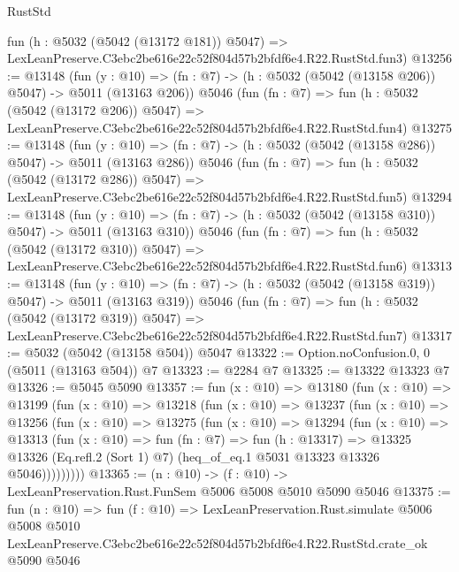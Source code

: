 \begin{lexlean}{RustStd}
\begin{coremodule}
    fun (h : @5032 (@5042 (@13172 @181)) @5047) =>
    LexLeanPreserve.C3ebc2be616e22c52f804d57b2bfdf6e4.R22.RustStd.fun3)
@13256 := @13148
    (fun (y : @10) => (fn : @7) -> (h : @5032 (@5042 (@13158 @206)) @5047) -> @5011 (@13163 @206))
    @5046
    (fun (fn : @7) =>
    fun (h : @5032 (@5042 (@13172 @206)) @5047) =>
    LexLeanPreserve.C3ebc2be616e22c52f804d57b2bfdf6e4.R22.RustStd.fun4)
@13275 := @13148
    (fun (y : @10) => (fn : @7) -> (h : @5032 (@5042 (@13158 @286)) @5047) -> @5011 (@13163 @286))
    @5046
    (fun (fn : @7) =>
    fun (h : @5032 (@5042 (@13172 @286)) @5047) =>
    LexLeanPreserve.C3ebc2be616e22c52f804d57b2bfdf6e4.R22.RustStd.fun5)
@13294 := @13148
    (fun (y : @10) => (fn : @7) -> (h : @5032 (@5042 (@13158 @310)) @5047) -> @5011 (@13163 @310))
    @5046
    (fun (fn : @7) =>
    fun (h : @5032 (@5042 (@13172 @310)) @5047) =>
    LexLeanPreserve.C3ebc2be616e22c52f804d57b2bfdf6e4.R22.RustStd.fun6)
@13313 := @13148
    (fun (y : @10) => (fn : @7) -> (h : @5032 (@5042 (@13158 @319)) @5047) -> @5011 (@13163 @319))
    @5046
    (fun (fn : @7) =>
    fun (h : @5032 (@5042 (@13172 @319)) @5047) =>
    LexLeanPreserve.C3ebc2be616e22c52f804d57b2bfdf6e4.R22.RustStd.fun7)
@13317 := @5032 (@5042 (@13158 @504)) @5047
@13322 := Option.noConfusion.{0, 0} (@5011 (@13163 @504)) @7
@13323 := @2284 @7
@13325 := @13322 @13323 @7
@13326 := @5045 @5090
@13357 := fun (x : @10) =>
  @13180
    (fun (x : @10) =>
    @13199
      (fun (x : @10) =>
      @13218
        (fun (x : @10) =>
        @13237
          (fun (x : @10) =>
          @13256
            (fun (x : @10) =>
            @13275
              (fun (x : @10) =>
              @13294
                (fun (x : @10) =>
                @13313
                  (fun (x : @10) =>
                  fun (fn : @7) =>
                  fun (h : @13317) =>
                  @13325
                    @13326
                    (Eq.refl.{2} (Sort 1) @7)
                    (heq_of_eq.{1} @5031 @13323 @13326 @5046)))))))))
@13365 := (n : @10) -> (f : @10) -> LexLeanPreservation.Rust.FunSem @5006 @5008 @5010 @5090 @5046
@13375 := fun (n : @10) =>
  fun (f : @10) =>
  LexLeanPreservation.Rust.simulate
    @5006
    @5008
    @5010
    LexLeanPreserve.C3ebc2be616e22c52f804d57b2bfdf6e4.R22.RustStd.crate_ok
    @5090
    @5046
\end{coremodule}
\end{lexlean}
